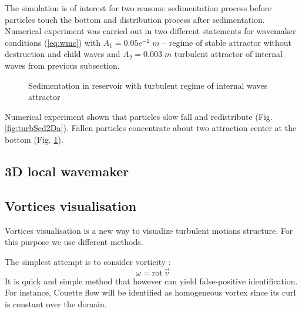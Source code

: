 \documentclass{article}
\begin{document}
The simulation is of interest for two reasons: sedimentation process before particles touch the bottom and distribution process after sedimentation. Numerical experiment was carried out in two different statements for wavemaker conditions (\ref{eq:wmc}) with $A_1=0.05e^{-2}\;m$ -- regime of stable attractor without destruction and child waves and $A_2=0.003\;m$ turbulent attractor of internal waves from previous subsection. 

\begin{figure}
\centering
    \begin{minipage}{0.45\textwidth}
        \centering
        \label{fig:turbSed2Da}
    \end{minipage}
    \begin{minipage}{0.45\textwidth}
        \centering
        \label{fig:turbSed2Db}
    \end{minipage}
    \caption{Sedimentation in reservoir with turbulent regime of internal waves attractor}
\end{figure}

Numerical experiment shown that particles slow fall and redistribute (Fig. \ref{fig:turbSed2Da}). Fallen particles concentrate about two attraction center at the bottom (Fig. \ref{fig:turbSed2Db}).

\subsection{3D local wavemaker}


\subsection{Vortices visualisation}

Vortices visualisation is a new way to visualize turbulent motions structure. For this purpose we use different methods.

The simplest attempt is to consider vorticity \cite{vortex}: $$\omega=\textrm{rot}\,\vec{v}$$
It is quick and simple method that however can yield false-positive identification. For instance, Couette flow will be identified as homogeneous vortex since its curl is constant over the domain.
\end{document}
